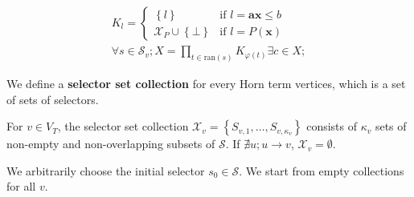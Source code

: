 \documentclass[a4paper,12pt]{article}
\begin{document}
\begin{align*}
K_l = \begin{cases}
\left\lbrace l \right\rbrace & \mbox{if } l = \mathbf{a} \mathbf{x} \leq b \\
\mathcal{X}_P \cup \left\lbrace \bot \right\rbrace
& \mbox{if } l = P(\mathbf{x})
\end{cases} \\
\forall s \in \mathcal{S}_v;
X = \prod_{t \in \mathrm{ran}(s)} K_{\varphi(t)}
\exists c \in X;
\end{align*}

We define a \textbf{selector set collection} \cite{albarghouthi13} for
every Horn term vertices, which is a set of sets of selectors.

For $v \in V_T$, the selector set collection $\mathcal{X}_v =
\left\lbrace S_{v,1}, \ldots, S_{v,\kappa_v} \right\rbrace$ consists
of $\kappa_v$ sets of non-empty and non-overlapping subsets of
$\mathcal{S}$. If $\nexists u; u \rightarrow v$, $\mathcal{X}_v =
\emptyset$.

We arbitrarily choose the initial selector $s_0 \in \mathcal{S}$. We
start from empty collections for all $v$.



\end{document}
